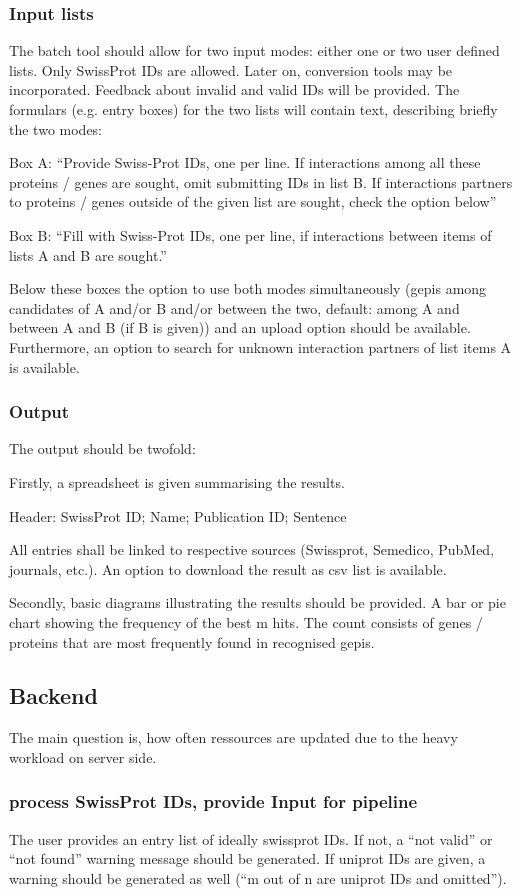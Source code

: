\documentclass[a4paper,10pt]{article}
\begin{document}
\subsubsection{Input lists}
The batch tool should allow for two input modes: either one or two user defined lists. Only SwissProt IDs are allowed. Later on, conversion tools may be incorporated. Feedback about invalid and valid IDs will be provided.
The formulars (e.g. entry boxes) for the two lists will contain text, describing briefly the two modes:

Box A: ``Provide Swiss-Prot IDs, one per line. If interactions among all these proteins / genes are sought, omit submitting IDs in list B. If interactions partners to proteins / genes outside of the given list are sought, check the option below''

Box B: ``Fill with Swiss-Prot IDs, one per line, if interactions between items of lists A and B are sought.''

Below these boxes the option to use both modes simultaneously (gepis among candidates of A and/or B and/or between the two, default: among A and between A and B (if B is given)) and an upload option should be available. Furthermore, an option to search for unknown interaction partners of list items A is available.

\subsubsection{Output}
The output should be twofold:

Firstly, a spreadsheet is given summarising the results.

Header: SwissProt ID; Name; Publication ID; Sentence

All entries shall be linked to respective sources (Swissprot, Semedico, Pub\-Med, journals, etc.).
An option to download the result as csv list is available.

Secondly, basic diagrams illustrating the results should be provided. A bar or pie chart showing the frequency of the best m hits. The count consists of genes / proteins that are most frequently found in recognised gepis.

\subsection{Backend}
The main question is, how often ressources are updated due to the heavy workload on server side.

\subsubsection{process SwissProt IDs, provide Input for pipeline}
The user provides an entry list of ideally swissprot IDs. If not, a ``not valid'' or ``not found'' warning message should be generated. If uniprot IDs are given, a warning should be generated as well (``m out of n are uniprot IDs and omitted'').
\end{document}
